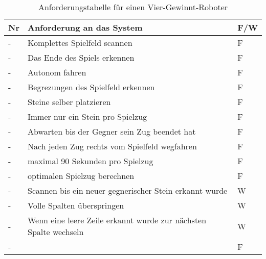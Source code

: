 \begin{table}[h]
	\centering
	\caption{Anforderungstabelle für einen Vier-Gewinnt-Roboter}
	\label{tab:Anforderungen}
	\begin{tabular}{|p{1cm}|p{12cm}| p{1cm}|}
		\hline
		\textbf{Nr} & \textbf{Anforderung an das System} & \textbf{F/W} \\
		\hline
		\hline
		- & Komplettes Spielfeld scannen & F\\
		\hline
		- & Das Ende des Spiels erkennen & F\\
		\hline
		- & Autonom fahren	& F\\
		\hline
		- &  Begrezungen des Spielfeld erkennen& F\\
		\hline
		- &Steine selber platzieren & F\\
		\hline
		- & Immer nur ein Stein pro Spielzug & F\\
		\hline
		-&  Abwarten bis der Gegner sein Zug beendet hat& F\\
		\hline
	
		- & Nach jeden Zug rechts vom Spielfeld wegfahren  & F\\
		\hline
		- & maximal 90 Sekunden pro Spielzug  & F\\
		\hline
		- & optimalen Spielzug berechnen & F\\
		\hline
		- & Scannen bis ein neuer gegnerischer Stein erkannt wurde  &W\\
		\hline
		- & Volle Spalten überspringen & W\\
		\hline
		- & Wenn eine leere Zeile erkannt wurde zur nächsten Spalte wechseln & W\\
		\hline
		- &  & F\\
		\hline
		
		
		

\end{tabular}
\end{table}
